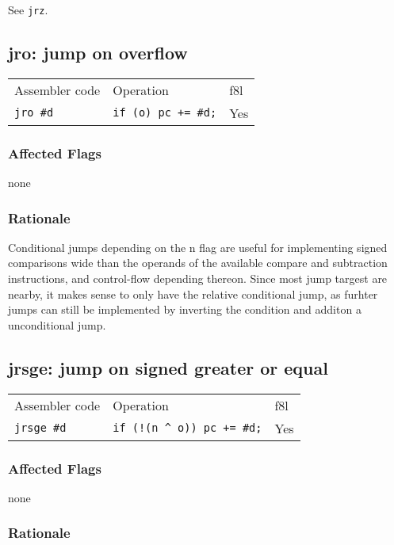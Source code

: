 \documentclass{book}
\begin{document}
See \texttt{jrz}.


\subsection{jro: jump on overflow}

\begin{tabular}{l l l}
Assembler code   & Operation                  & f8l \\
\texttt{jro \#d} & \texttt{if (o) pc += \#d;} & Yes \\
\end{tabular}

\subsubsection*{Affected Flags}

none

\subsubsection*{Rationale}

Conditional jumps depending on the n flag are useful for implementing signed comparisons wide than the operands of the available compare and subtraction instructions, and control-flow depending thereon. Since most jump targest are nearby, it makes sense to only have the relative conditional jump, as furhter jumps can still be implemented by inverting the condition and additon a unconditional jump.


\subsection{jrsge: jump on signed greater or equal}

\begin{tabular}{l l l}
Assembler code     & Operation                            & f8l \\
\texttt{jrsge \#d} & \texttt{if (!(n \^{} o)) pc += \#d;} & Yes \\
\end{tabular}

\subsubsection*{Affected Flags}

none

\subsubsection*{Rationale}
\end{document}
